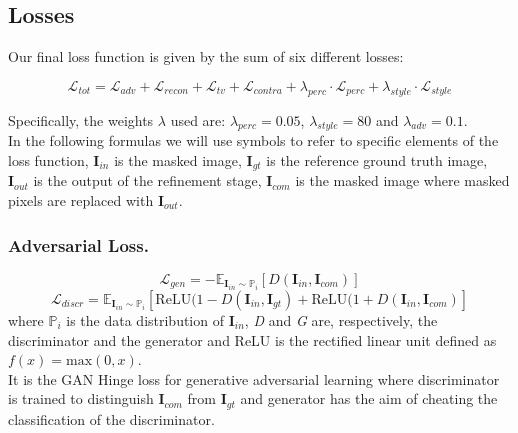 \documentclass[10pt,twocolumn,letterpaper]{article}
\begin{document}
\subsection{Losses}
Our final loss function is given by the sum of six different losses:

\begin{dmath}
      \mathcal{L}_{tot} = \mathcal{L}_{adv} + \mathcal{L}_{recon} +
      \mathcal{L}_{tv} + \mathcal{L}_{contra} + \lambda_{perc} \cdot
      \mathcal{L}_{perc} + \lambda_{style} \cdot \mathcal{L}_{style}
\end{dmath}

Specifically, the weights $\lambda$ used are: $\lambda_{perc} = 0.05$, $\lambda_{style} = 80$ and $\lambda_{adv} = 0.1$.
\\
In the following formulas we will use symbols to refer to specific elements of the loss function, $\mathbf{I}_{in}$ is the masked image, $\mathbf{I}_{gt}$ is the reference ground truth image, $\mathbf{I}_{out}$ is the output of the refinement stage, $\mathbf{I}_{com}$ is the masked image where masked pixels are replaced with $\mathbf{I}_{out}$.
\\
\subsubsection{Adversarial Loss.}
\begin{dmath}
    \mathcal{L}_{gen} = -\mathbb{E}_{\mathbf{I}_{in} \sim \mathbb{P}_i} [D(\mathbf{I}_{in},\mathbf{I}_{com})]
\end{dmath}
\begin{dmath}
    \mathcal{L}_{discr} = \mathbb{E}_{\mathbf{I}_{in} \sim \mathbb{P}_i} [\mathrm{ReLU}(1-D(\mathbf{I}_{in},\mathbf{I}_{gt}) + \mathrm{ReLU}(1+D(\mathbf{I}_{in},\mathbf{I}_{com})]
\end{dmath}
where \(\mathbb{P}_i\) is the data distribution of $\mathbf{I}_{in}$, \textit{D} and \textit{G} are, respectively, the discriminator and the generator and ReLU is the rectified linear unit defined as \(f(x) = \mathrm{max}(0,x)\).\\
It is the GAN Hinge loss for generative adversarial learning where discriminator is trained to distinguish $\mathbf{I}_{com}$ from $\mathbf{I}_{gt}$ and generator has the aim of cheating the classification of the discriminator.
\end{document}
